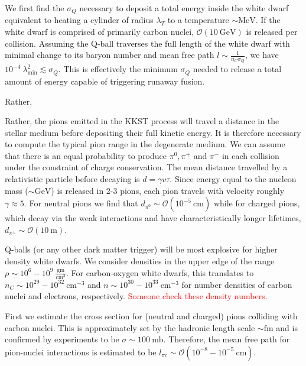 \documentclass[11 pt, preprint,preprintnumbers,amsmath,amssymb, prd]{revtex4}
\begin{document}
We first find the $\sigma_Q$ necessary to deposit a total energy inside the white dwarf equivalent to heating a cylinder of radius $\lambda_T$ to a temperature $\sim \text{MeV}$. If the white dwarf is comprised of primarily carbon nuclei, $\mathcal{O}(10 ~\text{GeV})$ is released per collision. Assuming the Q-ball traverses the full length of the white dwarf with minimal change to its baryon number and mean free path $l \sim \frac{1}{n_C \sigma_Q}$, we have $10^{-4} ~\lambda_{\text{min}}^2 \lesssim \sigma_Q$. This is effectively the minimum $\sigma_Q$ needed to release a total amount of energy capable of triggering runaway fusion. 

 Rather, 

Rather, the pions emitted in the KKST process will travel a distance in the stellar medium before depositing their full kinetic energy. It is therefore necessary to compute the typical pion range in the degenerate medium. We can assume that there is an equal probability to produce $\pi^0, \pi^+$ and $\pi^-$ in each collision under the constraint of charge conservation. The mean distance travelled by a relativistic particle before decaying is $d = \gamma v \tau$. Since energy equal to the nucleon mass ($\sim \text{GeV}$) is released in 2-3 pions, each pion travels with velocity roughly $\gamma \approx 5$. For neutral pions we find that $d_{\pi^0} \sim \mathcal{O}(10^{-5} ~\text{cm})$ while for charged pions, which decay via the weak interactions and have characteristically longer lifetimes, $d_{\pi^\pm} \sim \mathcal{O}(10 ~\text{m})$. 

Q-balls (or any other dark matter trigger) will be most explosive for higher density white dwarfs. We consider densities in the upper edge of the range $\rho \sim 10^{6} - 10^{9} ~\frac{\text{gm}}{\text{cm}^3}$. For carbon-oxygen white dwarfs, this translates to $n_C \sim 10^{29} - 10^{32} ~\text{cm}^{-3}$ and $n \sim 10^{30} - 10^{33} ~\text{cm}^{-3}$ for number densities of carbon nuclei and electrons, respectively. \textcolor{red}{Someone check these density numbers.}

First we estimate the cross section for (neutral and charged) pions colliding with carbon nuclei. This is approximately set by the hadronic length scale $\sim \text{fm}$ and is confirmed by experiments to be $\sigma \sim 100 ~\text{mb} $. Therefore, the mean free path for pion-nuclei interactions is estimated to be $l_{\pi c} \sim \mathcal{O}(10^{-8} - 10^{-5} ~\text{cm})$. 
\end{document}

